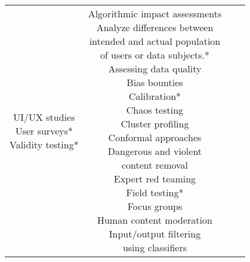 \documentclass[fleqn]{article}
\begin{document}
\begin{table}[H]
\begin{tabular}{|c|c|c|c|}
{			\textbullet\hspace{3pt} UI/UX studies\\ 	
			\textbullet\hspace{3pt} User surveys*\\ 	
			\textbullet\hspace{3pt} Validity testing*\\
		} 
		& \makecell[l]{
			\textbullet\hspace{3pt} Algorithmic impact assessments\\ 	
			\textbullet\hspace{3pt} Analyze differences between\\\hspace{10pt}intended and actual population\\\hspace{10pt}of users or data subjects.*\\	 	
			\textbullet\hspace{3pt} Assessing data quality\\ 	 	
			\textbullet\hspace{3pt} Bias bounties\\ 	
			\textbullet\hspace{3pt} Calibration*\\ 	
			\textbullet\hspace{3pt} Chaos testing\\ 	
			\textbullet\hspace{3pt} Cluster profiling\\ 	
			\textbullet\hspace{3pt} Conformal approaches\\ 	
			\textbullet\hspace{3pt} Dangerous and violent
			\\\hspace{10pt}content removal\\ 	
			\textbullet\hspace{3pt} Expert red teaming\\ 	
			\textbullet\hspace{3pt} Field testing*\\ 	
			\textbullet\hspace{3pt} Focus groups\\ 	
			\textbullet\hspace{3pt} Human content moderation\\ 	
			\textbullet\hspace{3pt} Input/output filtering\\\hspace{10pt}using classifiers\\ 	
}
\end{tabular}
\end{table}
\end{document}
